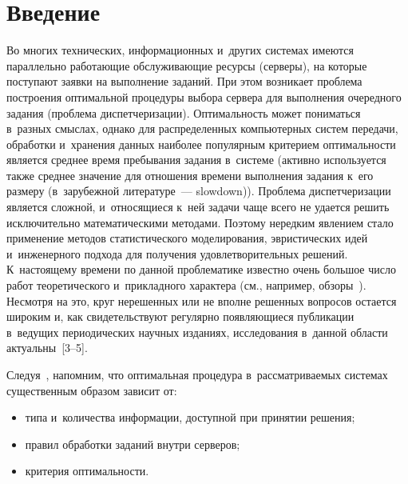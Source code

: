 



\thispagestyle{headings}

\begin{multicols}{2}

\label{st\stat}

\section{Введение}

    Во многих технических, информационных и~других системах имеются параллельно 
работающие обслуживающие ресурсы (серверы), на которые поступают заявки на 
выполнение заданий. При этом возникает проблема построения оптимальной процедуры 
выбора сервера для выполнения очередного задания (проблема диспетчеризации). 
Оптимальность может пониматься в~разных смыслах, однако для распределенных 
компьютерных систем передачи, обработки и~хранения данных наиболее популярным 
критерием оптимальности является среднее время пребывания задания 
в~сис\-те\-ме (активно используется также среднее значение для отношения времени 
выполнения задания к~его размеру (в~зарубежной литературе~--- slowdown)). Проблема 
диспетчеризации является сложной, и~относящиеся к~ней задачи чаще всего не удается 
решить исключительно математическими методами. Поэтому нередким явлением стало 
применение методов статистического моделирования, эвристических идей и~инженерного 
подхода для получения удовлетворительных решений. К~настоящему времени по данной 
проблематике известно очень большое число работ теоретического и~прикладного 
характера (см., например, обзоры~\cite{3-kon, 2-kon}). Несмотря на это, круг нерешенных 
или не вполне решенных вопросов остается широким и, как свидетельствуют регулярно 
появляющиеся публикации в~ведущих периодических научных изданиях, исследования 
в~данной области актуальны~[3--5].
    
    Следуя~\cite{1-kon}, напомним, что оптимальная процедура в~рассматриваемых 
системах существенным образом зависит от:
    \begin{itemize}
\item  типа и~количества информации, доступной при принятии решения;
\item правил обработки заданий внутри серверов;
\item критерия оптимальности.
\end{itemize}
    

\end{multicols}

